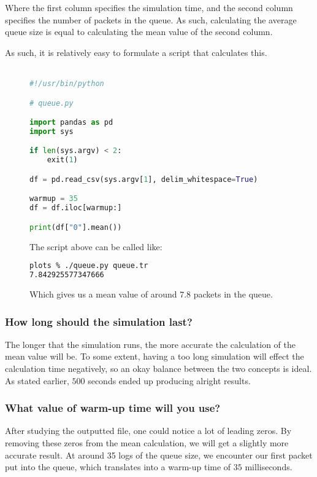 \documentclass[a4paper, titlepage,12pt]{article}
\begin{document}
			Where the first column specifies the simulation time, and the second column specifies the number of packets in the queue. As such, calculating the average queue size is equal to calculating the mean value of the second column.

			As such, it is relatively easy to formulate a script that calculates this.\\\\

			\begin{figure}[h!]
				\begin{lstlisting}[language=python]
#!/usr/bin/python

# queue.py

import pandas as pd
import sys

if len(sys.argv) < 2:
    exit(1)

df = pd.read_csv(sys.argv[1], delim_whitespace=True)

warmup = 35
df = df.iloc[warmup:]

print(df["0"].mean())

				\end{lstlisting}
			\end{figure}
			\begin{figure}[h!]
			The script above can be called like:
				\begin{lstlisting}[language=sh]
plots % ./queue.py queue.tr
7.842925577347666
				\end{lstlisting}
			Which gives us a mean value of around $7.8$ packets in the queue.
			\end{figure}
			\subsubsection*{How long should the simulation last?}
				The longer that the simulation runs, the more accurate the calculation of the mean value will be. To some extent, having a too long simulation will effect the calculation time negatively, so an okay balance between the two concepts is ideal. As stated earlier, $500$ seconds ended up producing alright results.

			\subsubsection*{What value of warm-up time will you use?}
				After studying the outputted file, one could notice a lot of leading zeros. By removing these zeros from the mean calculation, we will get a slightly more accurate result. At around 35 logs of the queue size, we encounter our first packet put into the queue, which translates into a warm-up time of $35$ milliseconds.
\end{document}
